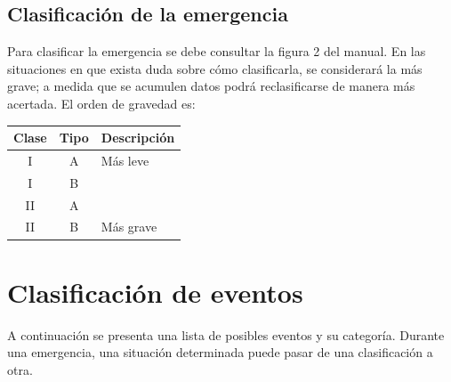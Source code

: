 \subsection{Clasificación de la emergencia}

Para clasificar la emergencia se debe consultar la figura 2 del manual. En las situaciones en que exista duda sobre cómo clasificarla, se considerará la más grave; a medida que se acumulen datos podrá reclasificarse de manera más acertada. El orden de gravedad es:
\begin{center}
\begin{tabular}{c c l}
\textbf{Clase} & \textbf{Tipo} & \textbf{Descripción} \\
\hline
I & A & Más leve \\
I & B & \\
II & A & \\
II & B & Más grave \\
\end{tabular}
\end{center}

\section{Clasificación de eventos}

A continuación se presenta una lista de posibles eventos y su categoría. Durante una emergencia, una situación determinada puede pasar de una clasificación a otra.

